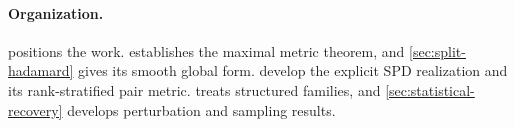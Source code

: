 \paragraph{Organization.}
 positions the work.  
establishes the maximal metric theorem, and \cref{sec:split-hadamard} gives its
smooth global form.  
develop the explicit SPD realization and its rank-stratified pair metric.
 treats structured families, and
\cref{sec:statistical-recovery} develops perturbation and sampling results.

